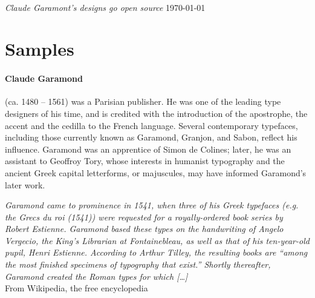 \documentclass[pagesize,DIV14]{scrartcl}
\begin{document}
{\pagestyle{empty}
\begin{center}
\pagestyle{empty}
\vspace*{5cm}
\\
\vspace*{2cm}
{\fontsize{24}{24}\textit{Claude {G}aramont’s designs go open source}
\vfill\vfill
\today\\\vspace*{2cm}}
\end{center}\clearpage}
\section{Samples}
\begin{multicols}{2}
\paragraph*{Claude Garamond} (ca. 1480 – 1561) was a Parisian publisher. He was one of the leading type designers  of his time, and is credited with the introduction of the apostrophe, the accent and the cedilla to the French language. Several contemporary typefaces, including those currently known as Garamond, Granjon, and Sabon, reflect his influence. Garamond was an apprentice of Simon de Colines; later, he was an assistant to Geoffroy Tory, whose interests in humanist typography and the ancient Greek capital letterforms, or majuscules, may have informed Garamond’s later work.

\textit{Garamond came to prominence in 1541, when three of his Greek typefaces (e.g. the Grecs du roi (1541)) were requested for a royally-ordered book series by Robert Estienne. Garamond based these types on the handwriting of Angelo Vergecio, the King’s Librarian at Fontainebleau, as well as that of his ten-year-old pupil, Henri Estienne. According to Arthur Tilley, the resulting books are “among the most finished specimens of typography that exist.” Shortly thereafter, Garamond created the Roman types for which […]}\\
{\scriptsize From Wikipedia, the free encyclopedia}
\begin{catalan}

\end{catalan}
\end{multicols}
\end{document}
